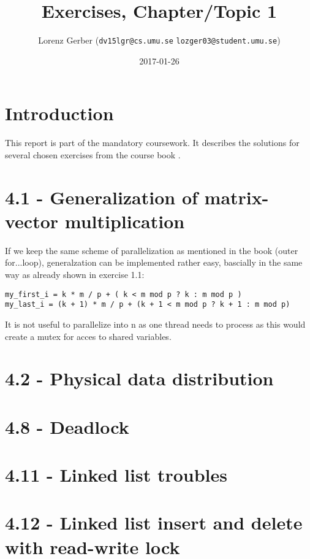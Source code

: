 \documentclass[a4paper,11pt,twoside]{article}
\title{Exercises, Chapter/Topic 1}
\author{Lorenz Gerber ({\tt{dv15lgr@cs.umu.se}} {\tt{lozger03@student.umu.se}})}
\date{2017-01-26}
\begin{document}
\lstset{language=C}
\maketitle
\thispagestyle{empty}
\newpage
\tableofcontents
\thispagestyle{empty}
\newpage

\clearpage
{}

\section{Introduction}
This report is part of the mandatory coursework. It describes the solutions for several chosen exercises from the course book \cite{pacheco2011}.
\section{4.1 - Generalization of matrix-vector multiplication}
If we keep the same scheme of parallelization as mentioned in the book (outer for...loop), generalzation can be implemented rather easy, bascially in the same way as already shown in exercise 1.1:

\begin{verbatim}                                                                                             
my_first_i = k * m / p + ( k < m mod p ? k : m mod p )                                                       
my_last_i = (k + 1) * m / p + (k + 1 < m mod p ? k + 1 : m mod p)  
\end{verbatim}

It is not useful to parallelize into n as one thread needs to process as this would create a mutex for acces to shared variables. 

\section{4.2 - Physical data distribution}


\section{4.8 - Deadlock}

\section{4.11 - Linked list troubles}

\section{4.12 - Linked list insert and delete with read-write lock}
\end{document}
